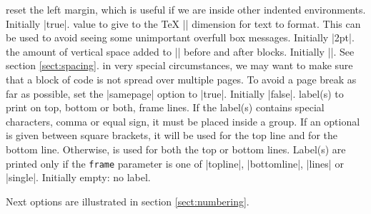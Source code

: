 \documentclass{article}
\def\CDRCheckRed {}
\begin{document}
\begin{description}
\itemtt[\CDRCheckRed list indent{[=true|false]}]
reset the left margin, which is useful if we are inside other indented environments.
Initially \CDRCode|true|.
\itemtt[\CDRCheckRed hfuzz=\CDRMeta{dimension}]
value to give to the \TeX{} \CDRCode|\hfuzz| dimension for text to format.
This can be used to avoid seeing some unimportant overfull box messages.
Initially \CDRCode|2pt|.
\itemtt[\CDRCheckRed vspace=\MyMeta{dimension}]
the amount of vertical space added to \CDRCode|\parskip| before and after blocks.
Initially \CDRCode|\topsep|. See section \ref{sect:spacing}.
\itemtt[\CDRCheckRed samepage{[=true|false]}]
in very special circumstances, we may want to make sure that a block of code is not spread over multiple pages.
To avoid a page break as far as possible, set the \CDRCode|samepage| option to \CDRCode|true|.
Initially \CDRCode|false|.
\itemtt[\CDRCheckRed label={\{[\CDRMeta{top string}]
\CDRMeta{string}\}}]
label(s) to print on top, bottom or both, frame lines.
If the label(s) contains special characters, comma or equal sign,
it must be placed inside a group.
If an optional  is given between square brackets,
it will be used for the top line and  for the bottom line.
Otherwise,  is used for both the top or bottom lines.
Label(s) are printed only if the \texttt{frame} parameter is one of
\CDRCode|topline|, \CDRCode|bottomline|, \CDRCode|lines| or \CDRCode|single|.
Initially empty: no label.
\end{description}
Next options are illustrated in section \ref{sect:numbering}.
\end{document}
